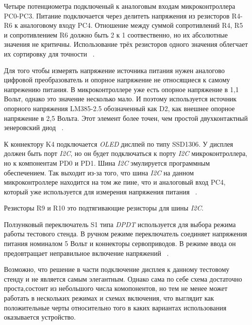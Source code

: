 Четыре потенциометра подключеный к аналоговым входам микроконтроллера PC0-PC3. Питание подключается через делитеть напряжения из резисторов R4-R6 к аналоговому входу PC4. Отношение между суммой сопротивлений R4, R5 и сопротивлением R6 должно быть 2 к 1 соотвественно, но их абсолютные значения не критичны. Использование трёх резисторов одного значения облегчает их сортировку для точности ~\cite{Elector521}.

Для того чтобы измерять напряжение источника питания нужен аналогово цифровой преобразователь и 
опорное напряжение не относящиеся к самому напрежению питания.
В микроконтроллере уже есть опорное напряжение в 1,1 Вольт, однако это значение несколько мало. И поэтому используется источник опорного напряжения LM385-2.5 обозначенный как D2, как внешнее опорное напряжение в 2,5 Вольта. Этот элемент более точен, чем простой двухконтактный зенеровский диод ~\cite{Elector521}.

К коннектору K4 подключается \textit{OLED} дислпей по типу SSD1306.
У дисплея должен быть порт \textit{I2C}, но он будет подключаться к порту \textit{I2C} микроконтроллера, но к компонентам PD0 и PD1. Шина \textit{I2C} эмулируется программным обеспечением. Так выходит из-за того, что шина \textit{I2C} на данном микроконтроллере находится на том же пине, что и аналоговый вход PC4, который уже используется для измерения напряжения питания ~\cite{Elector521}.

Резисторы R9 и R10 это подтягивающие резисторы для шины \textit{I2C}.

Ползунковый переключатель S1 типа \textit{DPDT} используется для выбора режима работы тестового стенда. В ручном режиме переключатель соединяет напряжения питания номиналом 5 Вольт и коннекторы сервоприводов. В режиме ввода он предовтращает неправильное включение напряжений ~\cite{Elector521}.

Возможно, что решение в части подключение дисплея к данному тестовому
стенду и не является самым элегантным. Однако сама по себе схема
достаточно проста,состоит из небольшого числа комопонентов, но тем не
менее может работать в нескольких режимах и схемах включения, что выглядит как положительные черты относительно того в каких вариантах использования оказывается устройство.